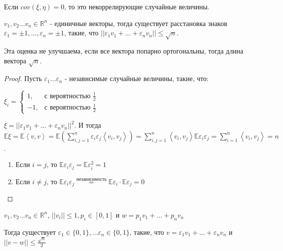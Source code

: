 \begin{definition}
    Если $cov (\xi, \eta) = 0$, то это некоррелирующие случайные величины.
\end{definition}

\begin{theorem}

    $v_1, v_2 \ldots v_n \in \mathbb{R}^n$ - единичные векторы, тогда
    существует расстановка знаков $\varepsilon_1 = \pm 1, \ldots, \varepsilon_n = \pm 1$,
    такие, что $||\varepsilon_1 v_1 + \ldots + \varepsilon_nv_n|| \leqslant \sqrt{n}$.

    \begin{remark}
        Эта оценка не улучшаема, если все вектора попарно ортогональны, тогда
        длина вектора $\sqrt{n}$.
    \end{remark}
\end{theorem}

\begin{proof}
    Пусть $\varepsilon_1 \ldots \varepsilon_n$ - независимые случайные величины, такие, что:

    $
    \xi_{i} =
    \begin{cases}
        1, & \text{с вероятностью $\frac{1}{2}$} \\
        -1, & \text{с вероятностью $\frac{1}{2}$}
    \end{cases}
    $

    $\xi = || \varepsilon_1 v_1 + \ldots + \varepsilon_nv_n ||^2 $. И тогда $\mathbb{E} \xi = \mathbb{E} \left < v, v \right >  =
    \mathbb{E} (\sum_{i, j = 1}^n \varepsilon_i \varepsilon_j \left < v_i, v_j \right >) =
    \sum_{i, j = 1}^n \left < v_i, v_j \right > \mathbb{E} \varepsilon_i \varepsilon_j =
    \sum_{i = 1}^n \left < v_i, v_j \right > = n$.

    \begin{enumerate}
        \item Если $i = j$, то $\mathbb{E} \varepsilon_i \varepsilon_j = \mathbb{E} \varepsilon_i^2 = 1$
        \item Если $i \neq j$, то $\mathbb{E}\varepsilon_i \varepsilon_j \overset{\text{независимость}}{=} \mathbb{E} \varepsilon_i \cdot \mathbb{E} \varepsilon_j = 0$
    \end{enumerate}
\end{proof}

\begin{theorem}

    $v_1, v_2 \ldots v_n \in \mathbb{R}^n$, $|| v_i || \leqslant 1, p_i \in [0, 1] $ и
    $w = p_1v_1 + \ldots + p_n v_n$

    Тогда существует $\varepsilon_1 \in \{ 0, 1 \}, \ldots \varepsilon_n \in \{ 0, 1 \}$,
    такие, что $v = \varepsilon_1v_1 + \ldots + \varepsilon_nv_n$ и $|| v - w || \leqslant \frac{\sqrt{n}}{2}$
\end{theorem}

